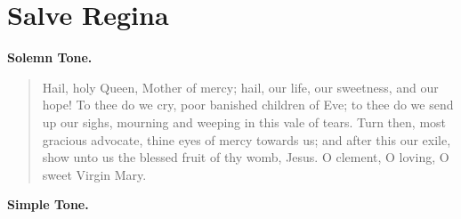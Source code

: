 {{\afterant{}
}





\section{Salve Regina}
\begin{center}\textbf{Solemn Tone.}\end{center}
\begin{quote}{Hail, holy Queen, Mother of mercy; hail, our life, our sweetness, and our hope! To thee do we cry, poor banished children of Eve; to thee do we send up our sighs, mourning and weeping in this vale of tears.  Turn then, most gracious advocate, thine eyes of mercy towards us; and after this our exile, show unto us the blessed fruit of thy womb, Jesus.  O clement, O loving, O sweet Virgin Mary.}\end{quote}
\begin{center}\textbf{Simple Tone.}\end{center}

\bigskip{}
{
\newcommand{\vlatin}{Ora pro nóbis sáncta Déi Génitrix.}
\newcommand{\venglish}{ Pray for us, O holy Mother of God.}
\newcommand{\rlatin}{Ut dígni efficiámur promissiónibus Chrísti.}
\newcommand{\renglish}{That we may be made worthy of the promises of Christ.}
\newcommand{\prayerlatin}{Omnípotens sempitérne Deus, qui gloriósæ Vírginis Matris Maríæ corpus et ánimam, ut dignum Fílii tui habitáculum éffici mererétur, Spíritu Sancto cooperánte præparásti~:~\gredagger{} da, ut cujus commemoratióne lætámur,~* ejus pia intercessióne ab instántibus malis et a morte perpétua liberémur. Per eúmdem Christum Dóminum nostrum. \Rbar~Amen.}
\newcommand{\prayerenglish}{Almighty, everlasting God, who with the cooperation of the Holy Ghost didst prepare the body and soul of the glorious Virgin Mary, to make it fit to be the worthy dwelling of Thy Son; grant that by the loving intercession of her in whose commemoration we rejoice, we may be delivered from present ills, and from everlasting death.  Through the same Christ our Lord. \Rbar~Amen.}

\afterant{}
}

}
